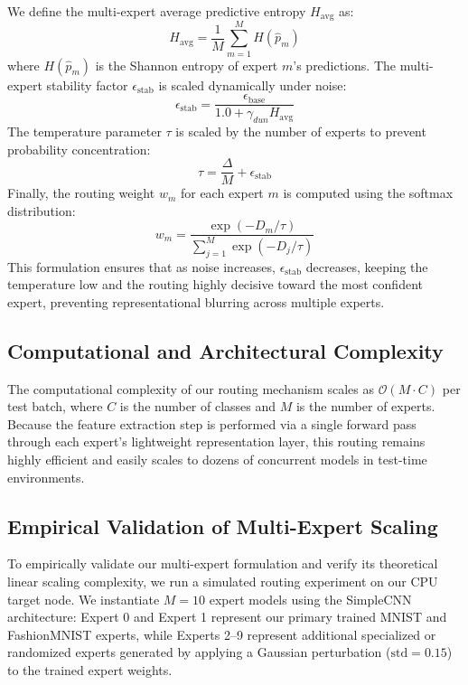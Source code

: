 \documentclass{article}
\theoremstyle{plain}
\theoremstyle{definition}
\theoremstyle{remark}
\begin{document}
We define the multi-expert average predictive entropy $H_{\text{avg}}$ as:
\begin{equation}
    H_{\text{avg}} = \frac{1}{M} \sum_{m=1}^M H(\hat{p}_m)
\end{equation}
where $H(\hat{p}_m)$ is the Shannon entropy of expert $m$'s predictions.
The multi-expert stability factor $\epsilon_{\text{stab}}$ is scaled dynamically under noise:
\begin{equation}
    \epsilon_{\text{stab}} = \frac{\epsilon_{\text{base}}}{1.0 + \gamma_{dun} H_{\text{avg}}}
\end{equation}
The temperature parameter $\tau$ is scaled by the number of experts to prevent probability concentration:
\begin{equation}
    \tau = \frac{\Delta}{M} + \epsilon_{\text{stab}}
\end{equation}
Finally, the routing weight $w_m$ for each expert $m$ is computed using the softmax distribution:
\begin{equation}
    w_m = \frac{\exp\left(-D_m / \tau\right)}{\sum_{j=1}^M \exp\left(-D_j / \tau\right)}
\end{equation}
This formulation ensures that as noise increases, $\epsilon_{\text{stab}}$ decreases, keeping the temperature low and the routing highly decisive toward the most confident expert, preventing representational blurring across multiple experts.

\subsection{Computational and Architectural Complexity}
The computational complexity of our routing mechanism scales as $\mathcal{O}(M \cdot C)$ per test batch, where $C$ is the number of classes and $M$ is the number of experts. Because the feature extraction step is performed via a single forward pass through each expert's lightweight representation layer, this routing remains highly efficient and easily scales to dozens of concurrent models in test-time environments.

\subsection{Empirical Validation of Multi-Expert Scaling}
To empirically validate our multi-expert formulation and verify its theoretical linear scaling complexity, we run a simulated routing experiment on our CPU target node. We instantiate $M=10$ expert models using the SimpleCNN architecture: Expert 0 and Expert 1 represent our primary trained MNIST and FashionMNIST experts, while Experts 2--9 represent additional specialized or randomized experts generated by applying a Gaussian perturbation ($\text{std} = 0.15$) to the trained expert weights.
\end{document}
